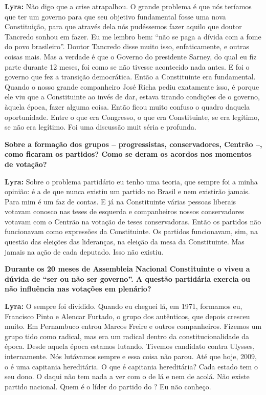 \textbf{Lyra:} Não digo que a crise atrapalhou. O grande problema é que
nós teríamos que ter um governo para que seu objetivo fundamental fosse
uma nova Constituição, para que através dela nós pudéssemos fazer aquilo
que doutor Tancredo sonhou em fazer. Eu me lembro bem: ``não se paga a
dívida com a fome do povo brasileiro''. Doutor Tancredo disse muito
isso, enfaticamente, e outras coisas mais. Mas a verdade é que o Governo
do presidente Sarney, do qual eu fiz parte durante 12 meses, foi como se
não tivesse acontecido nada antes. E foi o governo que fez a transição
democrática. Então a Constituinte era fundamental. Quando o nosso grande
companheiro José Richa pediu exatamente isso, é porque ele viu que a
Constituinte ao invés de dar, estava tirando condições de o governo,
àquela época, fazer alguma coisa. Então ficou muito confuso o quadro
daquela oportunidade. Entre o que era Congresso, o que era Constituinte,
se era legítimo, se não era legítimo. Foi uma discussão muit séria e
profunda.

\textbf{Sobre a formação dos grupos -- progressistas, conservadores,
Centrão --, como ficaram os partidos? Como se deram os acordos nos
momentos de votação?}

\textbf{Lyra:} Sobre o problema partidário eu tenho uma teoria, que
sempre foi a minha opinião: é a de que nunca existiu um partido no
Brasil e nem existirão jamais. Para mim é um faz de contas. E já na
Constituinte várias pessoas liberais votavam conosco nas teses de
esquerda e companheiros nossos conservadores votavam com o Centrão na
votação de teses conservadoras. Então os partidos não funcionavam como
expressões da Constituinte. Os partidos funcionavam, sim, na questão das
eleições das lideranças, na eleição da mesa da Constituinte. Mas jamais
na ação de cada deputado. Isso não existiu.

\textbf{Durante os 20 meses de Assembleia Nacional Constituinte o 
viveu a dúvida de ``ser ou não ser governo''. A questão partidária
exercia ou não influência nas votações em plenário?}

\textbf{Lyra:} O  sempre foi dividido. Quando eu cheguei lá, em
1971, formamos eu, Francisco Pinto e Alencar Furtado, o grupo dos
autênticos, que depois cresceu muito. Em Pernambuco entrou Marcos Freire
e outros companheiros. Fizemos um grupo tido como radical, mas era um
radical dentro da constitucionalidade da época. Desde aquela época
estamos lutando. Tivemos candidato contra Ulysses, internamente. Nós
lutávamos sempre e essa coisa não parou. Até que hoje, 2009, o  é
uma capitania hereditária. O que é capitania hereditária? Cada estado
tem o seu dono. O  daqui não tem nada a ver com o  de lá e nem
de acolá. Não existe partido nacional. Quem é o líder do partido do
? Eu não conheço.

